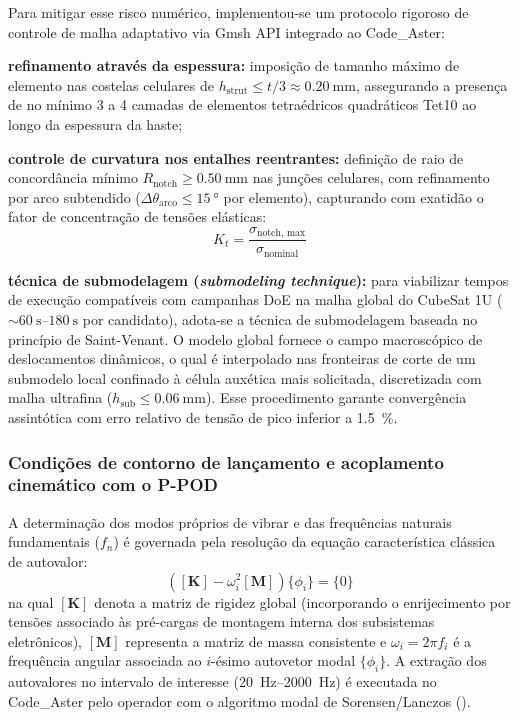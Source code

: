Para mitigar esse risco numérico, implementou-se um protocolo rigoroso de controle de malha adaptativo via Gmsh API integrado ao Code\_Aster:
\begin{alineas}
  \item \textbf{refinamento através da espessura:} imposição de tamanho máximo de elemento nas costelas celulares de $h_{\text{strut}} \le t / 3 \approx \SI{0.20}{\milli\metre}$, assegurando a presença de no mínimo 3 a 4 camadas de elementos tetraédricos quadráticos Tet10 ao longo da espessura da haste;
  \item \textbf{controle de curvatura nos entalhes reentrantes:} definição de raio de concordância mínimo $R_{\text{notch}} \ge \SI{0.50}{\milli\metre}$ nas junções celulares, com refinamento por arco subtendido ($\Delta \theta_{\text{arco}} \le \SI{15}{\degree}$ por elemento), capturando com exatidão o fator de concentração de tensões elásticas:
  \begin{equation}
    K_t = \frac{\sigma_{\text{notch, max}}}{\sigma_{\text{nominal}}}
    \label{eq:kt}
  \end{equation}
  \item \textbf{técnica de submodelagem (\textit{submodeling technique}):} para viabilizar tempos de execução compatíveis com campanhas DoE na malha global do CubeSat 1U ($\sim \SIrange{60}{180}{\second}$ por candidato), adota-se a técnica de submodelagem baseada no princípio de Saint-Venant. O modelo global fornece o campo macroscópico de deslocamentos dinâmicos, o qual é interpolado nas fronteiras de corte de um submodelo local confinado à célula auxética mais solicitada, discretizada com malha ultrafina ($h_{\text{sub}} \le \SI{0.06}{\milli\metre}$). Esse procedimento garante convergência assintótica com erro relativo de tensão de pico inferior a \SI{1.5}{\percent}.
\end{alineas}

\subsubsection{Condições de contorno de lançamento e acoplamento cinemático com o P-POD}
\label{subsubsec:modal}

A determinação dos modos próprios de vibrar e das frequências naturais fundamentais ($f_n$) é governada pela resolução da equação característica clássica de autovalor:
\begin{equation}
  \left( [\mathbf{K}] - \omega_i^{2} [\mathbf{M}] \right) \{\phi_i\} = \{0\}
  \label{eq:autovalor}
\end{equation}
na qual $[\mathbf{K}]$ denota a matriz de rigidez global (incorporando o enrijecimento por tensões associado às pré-cargas de montagem interna dos subsistemas eletrônicos), $[\mathbf{M}]$ representa a matriz de massa consistente e $\omega_i = 2\pi f_i$ é a frequência angular associada ao $i$-ésimo autovetor modal $\{\phi_i\}$. A extração dos autovalores no intervalo de interesse (\SIrange{20}{2000}{\hertz}) é executada no Code\_Aster pelo operador  com o algoritmo modal de Sorensen/Lanczos ().

